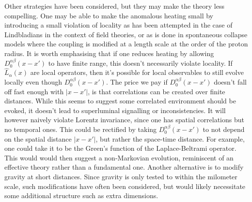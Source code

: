 \documentclass[aps,pra,showpacs,citeautoscript,amsmath,amssymb,floatfix,superscriptaddress,bbm, verbatim,amsfonts,changes,12pt,nofootinbib,longbibliography]{revtex4-2}
\def\L{{\hat{L}}}
\def\ab{^{\alpha\beta}}
\begin{document}
Other strategies have been considered, but they may make the theory less compelling. One may be able to make the anomalous heating small by introducing a small violation of locality as has been attempted in the case of Lindbladians in the context of field theories\cite{poulinKITP}, or as is done in spontaneous collapse models where the coupling is modified at a length scale at the order of the proton radius. 
It is worth emphasising that if one reduces heating by allowing  $D_0\ab(x-x')$ to have finite range, this doesn't necessarily violate locality. If $\L_{\alpha}(x)$ are local operators, then it's possible for local observables to still evolve locally even though $D_0\ab(x-x')$.  The price we pay if $D_0\ab(x-x')$ doesn't fall off fast enough with  $|x-x'|$, is that correlations can be created over finite distances\cite{bps, OR-intrinsic}. While this seems to suggest some  correlated environment should be evoked, it doesn't lead to superluminal signalling or inconsistencies. It will however naively violate Lorentz invariance, since one has spatial correlations but no temporal ones. This could be rectified by taking $D_0\ab(x-x')$ to not  depend on the spatial distance $|x-x'|$, but rather the space-time distance. For example, one could take it to be the Green's function of the Laplace-Beltrami operator. This would would then suggest a non-Markovian evolution, reminiscent of an effective theory rather than a fundamental one. 
Another alternative is to modify gravity at short distances. Since gravity is only tested to within the milometer scale, such modifications have often been considered, but would likely necessitate some additional structure such as extra dimensions\cite{arkani1998hierarchy}.
\end{document}

